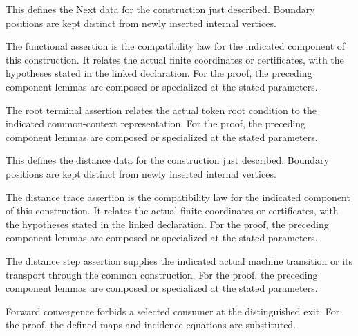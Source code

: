 This defines the Next data for the construction just described. Boundary positions are kept distinct from newly inserted internal vertices.
\par{}

The functional assertion is the compatibility law for the indicated component of this construction. It relates the actual finite coordinates or certificates, with the hypotheses stated in the linked declaration.
For the proof, the preceding component lemmas are composed or specialized at the stated parameters.
\par{}

The root terminal assertion relates the actual token root condition to the indicated common-context representation.
For the proof, the preceding component lemmas are composed or specialized at the stated parameters.
\par{}

This defines the distance data for the construction just described. Boundary positions are kept distinct from newly inserted internal vertices.
\par{}

The distance trace assertion is the compatibility law for the indicated component of this construction. It relates the actual finite coordinates or certificates, with the hypotheses stated in the linked declaration.
For the proof, the preceding component lemmas are composed or specialized at the stated parameters.
\par{}

The distance step assertion supplies the indicated actual machine transition or its transport through the common construction.
For the proof, the preceding component lemmas are composed or specialized at the stated parameters.
\par{}

Forward convergence forbids a selected consumer at the distinguished exit.
For the proof, the defined maps and incidence equations are substituted.
\par{}


